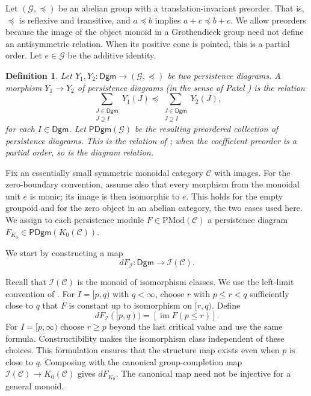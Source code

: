 \documentclass{amsart}
\newtheorem{definition}[theorem]{Definition}
\begin{document}
Let $(\mathcal{G}, \preceq)$ be an abelian group with a translation-invariant preorder. That is, $\preceq$ is reflexive and transitive, and $a\preceq b$ implies $a+c\preceq b+c$. We allow preorders because the image of the object monoid in a Grothendieck group need not define an antisymmetric relation. When its positive cone is pointed, this is a partial order. Let $e\in\mathcal G$ be the additive identity.

\begin{definition}
Let $Y_1, Y_2 \colon \mathsf{Dgm} \to (\mathcal{G}, \preceq)$ be two persistence diagrams. A \textit{morphism} $Y_1 \to Y_2$ of persistence diagrams (in the sense of Patel \cite[Definition~5.1, p.~405]{patel2016generalized}) is the relation
$$ \sum_{\substack{J \in \mathsf{Dgm}\\ J \supseteq I}} Y_1(J) \preceq \sum_{\substack{J \in \mathsf{Dgm}\\ J \supseteq I}} Y_2(J), $$
for each $I \in \mathsf{Dgm}$. Let $\mathsf{PDgm}(\mathcal{G})$ be the resulting preordered collection of persistence diagrams. This is the relation of \cite[Definition~5.1]{patel2016generalized}; when the coefficient preorder is a partial order, so is the diagram relation.
\end{definition}

Fix an essentially small symmetric monoidal category $\mathcal{C}$ with images. For the zero-boundary convention, assume also that every morphism from the monoidal unit $e$ is monic; its image is then isomorphic to $e$. This holds for the empty groupoid and for the zero object in an abelian category, the two cases used here. We assign to each persistence module $F \in \mathrm{PMod}(\mathcal{C})$ a persistence diagram $F_{K_0} \in \mathsf{PDgm}(K_0(\mathcal{C}))$.

We start by constructing a map
$$ dF_{\mathcal{I}} \colon \mathsf{Dgm} \to \mathcal{I}(\mathcal{C}). $$

Recall that $\mathcal I(\mathcal C)$ is the monoid of isomorphism classes. We use the left-limit convention of \cite[Section~7, p.~409]{patel2016generalized}. For $I=[p,q)$ with $q<\infty$, choose $r$ with $p\leq r<q$ sufficiently close to $q$ that $F$ is constant up to isomorphism on $[r,q)$. Define
\[
dF_{\mathcal I}([p,q))=[\operatorname{im}F(p\leq r)].
\]
For $I=[p,\infty)$ choose $r\geq p$ beyond the last critical value and use the same formula. Constructibility makes the isomorphism class independent of these choices. This formulation ensures that the structure map exists even when $p$ is close to $q$.
Composing with the canonical group-completion map $\mathcal I(\mathcal C)\to K_0(\mathcal C)$ gives $dF_{K_0}$. The canonical map need not be injective for a general monoid.
\end{document}
